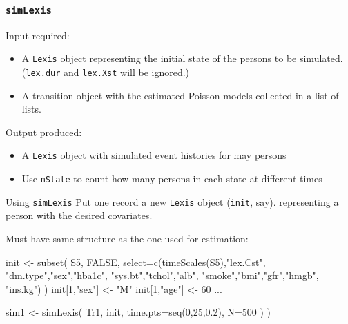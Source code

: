 % 

\begin{frame}
   \frametitle{\texttt{simLexis}}
Input required:
   \begin{itemize}[<+->]
   \item A \texttt{Lexis} object representing the initial state of the persons
     to be simulated.\\
   (\texttt{lex.dur} and \texttt{lex.Xst} will be ignored.)
 \item A transition object with the estimated Poisson models collected
   in a list of lists.
   \end{itemize}

\pause
Output produced:
\pause
\begin{itemize}[<+->]
\item A \texttt{Lexis} object with simulated event histories for may persons
\item Use \texttt{nState} to count how many persons in each state at
  different times
\end{itemize}

\end{frame}

\begin{frame}[fragile]{Using \texttt{simLexis}}
Put one record a new \texttt{Lexis} object (\texttt{init}, say).
representing a person with the desired covariates.

Must have same structure as the one used for estimation:\\[-1ex]

\renewcommand{\baselinestretch}{0.8}
\footnotesize
\begin{semiverbatim}
init <- subset( S5, \alert<2>{FALSE},
                    \alert<3>{select=}c(timeScales(S5),"lex.Cst",
                         "dm.type","sex","hba1c",
                         "sys.bt","tchol","alb",
                         "smoke","bmi","gfr","hmgb",
                         "ins.kg") )
init[\alert<4>{1},"sex"] <- "M"
init[\alert<4>{1},"age"] <- 60
...

sim1 <- simLexis( Tr1, init,
                  time.pts=seq(0,25,0.2),
                  N=500 ) )
\end{semiverbatim}
\normalsize
\renewcommand{\baselinestretch}{1.0}
\end{frame}

